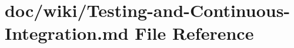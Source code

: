 \hypertarget{_testing-and-_continuous-_integration_8md}{}\section{doc/wiki/\+Testing-\/and-\/\+Continuous-\/\+Integration.md File Reference}
\label{_testing-and-_continuous-_integration_8md}
